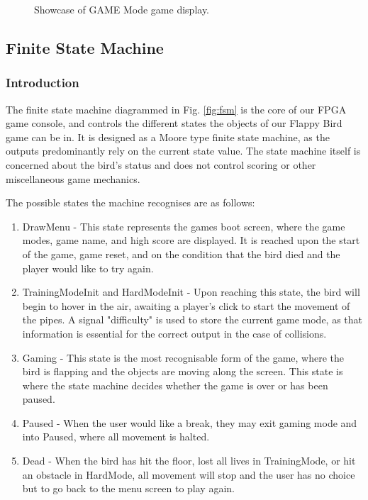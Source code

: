 \documentclass[conference]{IEEEtran}
\begin{document}
\begin{figure}[htbp]
	\caption{Showcase of GAME Mode game display.}
	\label{fig:game-mode}
\end{figure}

\subsection{Finite State Machine}
\subsubsection{Introduction}
The finite state machine diagrammed in Fig. \ref{fig:fsm} is the core of our FPGA game console, and controls the different states the objects of our Flappy Bird game can be in. It is designed as a Moore type finite state machine, as the outputs predominantly rely on the current state value. The state machine itself is concerned about the bird's status and does not control scoring or other miscellaneous game mechanics.

The possible states the machine recognises are as follows:

\begin{enumerate}
	\item DrawMenu - This state represents the games boot screen, where the game modes, game name, and high score are displayed. It is reached upon the start of the game, game reset, and on the condition that the bird died and the player would like to try again.
	\item TrainingModeInit and HardModeInit - Upon reaching this state, the bird will begin to hover in the air, awaiting a player's click to start the movement of the pipes. A signal "difficulty" is used to store the current game mode, as that information is essential for the correct output in the case of collisions.
	\item Gaming - This state is the most recognisable form of the game, where the bird is flapping and the objects are moving along the screen. This state is where the state machine decides whether the game is over or has been paused.
	\item Paused - When the user would like a break, they may exit gaming mode and into Paused, where all movement is halted.
	\item Dead - When the bird has hit the floor, lost all lives in TrainingMode, or hit an obstacle in HardMode, all movement will stop and the user has no choice but to go back to the menu screen to play again.
\end{enumerate}
\end{document}
